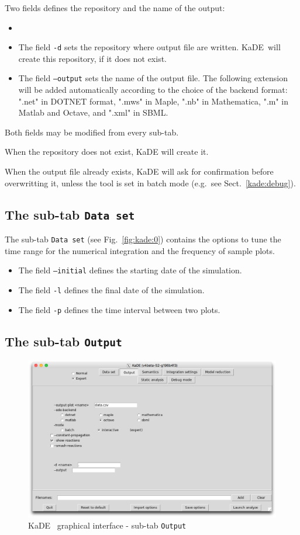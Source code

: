 \documentclass[11pt]{book}
\def\KaDE{\textsf{KaDE}}
\begin{document}
Two fields defines the repository and the name of the output:
\begin{itemize}
  \item \item The field \texttt{-d} sets  the repository where output file are written. \KaDE~will create this repository, if it does not exist.
\item The field \texttt{--output} sets the name of the output file.
The following extension will be added automatically according to the choice of the backend format: ".net" in DOTNET format, ".mws" in Maple, ".nb" in Mathematica, ".m" in Matlab and Octave, and ".xml" in SBML.
\end{itemize}
Both fields may be modified from every sub-tab.

When the repository does not exist, {\KaDE} will create it.

When the output file already exists, {\KaDE} will ask for confirmation before overwritting it, unless the tool is set in batch mode (e.g.~see Sect.~\ref{kade:debug}).

\subsection{The sub-tab \texttt{Data set}}

The sub-tab \texttt{Data set} (see Fig.~\ref{fig:kade:0}) contains the options to tune the time range for the numerical integration and the frequency of sample plots.
\begin{itemize}
\item The field \texttt{--initial} defines the starting date of the simulation.
\item The field \texttt{-l} defines the final date of the simulation.
\item The field \texttt{-p} defines the time interval between two plots.
\end{itemize}

\subsection{The sub-tab \texttt{Output}}

\begin{figure}[htbp]
\centering
\includegraphics[width=12cm,bb=0 0 1904 1208]{img/kade_1.png}
\caption{\KaDE~ graphical interface - sub-tab \texttt{Output}}
\label{fig:kade:1}
\end{figure}
\end{document}
